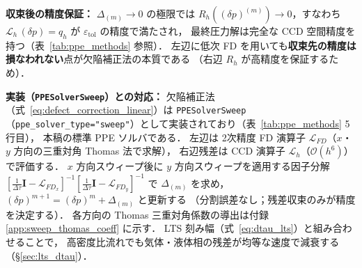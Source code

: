 \textbf{収束後の精度保証：}
$\Delta_{(m)} \to 0$ の極限では $R_h((\delta p)^{(m)}) \to 0$，すなわち
$\mathcal{L}_h\,(\delta p) = q_h$ が $\varepsilon_\mathrm{tol}$ の精度で満たされ，
最終圧力解は完全な CCD 空間精度を持つ（表~\ref{tab:ppe_methods} 参照）．
左辺に低次 FD を用いても\textbf{収束先の精度は損なわれない}点が欠陥補正法の本質である
（右辺 $R_h$ が高精度を保証するため）．

\textbf{実装（\texttt{PPESolverSweep}）との対応：}
欠陥補正法（式~\eqref{eq:defect_correction_linear}）は
\texttt{PPESolverSweep}（\texttt{ppe\_solver\_type="sweep"}）として実装されており（表~\ref{tab:ppe_methods} 5行目），
本稿の標準 PPE ソルバである．
左辺は 2次精度 FD 演算子 $\mathcal{L}_{FD}$（$x$・$y$ 方向の三重対角 Thomas 法で求解），
右辺残差は CCD 演算子 $\mathcal{L}_h$（$\mathcal{O}(h^6)$）で評価する．
$x$ 方向スウィープ後に $y$ 方向スウィープを適用する因子分解
$[\frac{1}{\Delta\tau}\mathbf{I} - \mathcal{L}_{FD_x}]^{-1}[\frac{1}{\Delta\tau}\mathbf{I} - \mathcal{L}_{FD_y}]^{-1}$
で $\Delta_{(m)}$ を求め，$(\delta p)^{m+1} = (\delta p)^{m} + \Delta_{(m)}$ と更新する
（分割誤差なし；残差収束のみが精度を決定する）．
各方向の Thomas 三重対角係数の導出は付録 \ref{app:sweep_thomas_coeff} に示す．
LTS 刻み幅（式~\eqref{eq:dtau_lts}）と組み合わせることで，
高密度比流れでも気体・液体相の残差が均等な速度で減衰する（§\ref{sec:lts_dtau}）．

